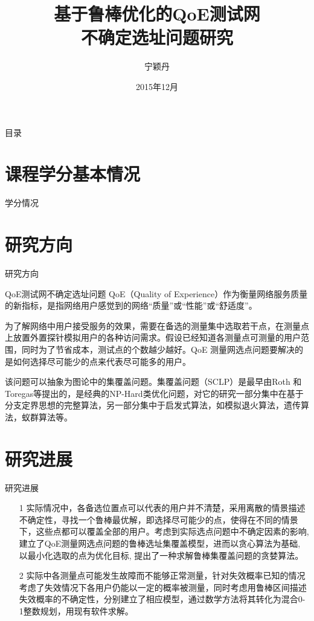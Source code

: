 \documentclass[10pt]{beamer}
\title{基于鲁棒优化的QoE测试网\\不确定选址问题研究}
\author{宁颖丹}
\institute{中国科学院大学~数学科学学院\\专业方向：运筹学与控制论\\指导教师：杨文国副教授}
\date{2015年12月}
\begin{document}
\small
\begin{frame}
  \titlepage
\end{frame}

\begin{frame}{目录}
  \tableofcontents
\end{frame}

\section{课程学分基本情况}
\begin{frame}{学分情况}

\end{frame}

\section{研究方向}
\begin{frame}{研究方向}
 \begin{block}{QoE测试网不确定选址问题}
  QoE（Quality of Experience）作为衡量网络服务质量的新指标，是指网络用户感觉到的网络“质量”或“性能”或“舒适度”。

为了解网络中用户接受服务的效果，需要在备选的测量集中选取若干点，在测量点上放置外置探针模拟用户的各种访问需求。假设已经知道各测量点可测量的用户范围，同时为了节省成本，测试点的个数越少越好。QoE 测量网选点问题要解决的是如何选择尽可能少的点来代表尽可能多的用户。
\end{block} 
该问题可以抽象为图论中的集覆盖问题。集覆盖问题（SCLP）是最早由Roth 和Toregas等提出的，是经典的NP-Hard类优化问题，对它的研究一部分集中在基于分支定界思想的完整算法，另一部分集中于启发式算法，如模拟退火算法，遗传算法，蚁群算法等。
\end{frame}
\section{研究进展}
\begin{frame}{研究进展}
  \begin{itemize}
    \item[1] 实际情况中，各备选位置点可以代表的用户并不清楚，采用离散的情景描述不确定性，寻找一个鲁棒最优解，即选择尽可能少的点，使得在不同的情景下，这些点都可以覆盖全部的用户。考虑到{\color{red}实际选点问题中不确定因素的影响, 建立了QoE测量网选点问题的鲁棒选址集覆盖模型，进而以贪心算法为基础, 以最小化选取的点为优化目标, 提出了一种求解鲁棒集覆盖问题的贪婪算法。}
    \item[2] 实际中各测量点可能发生故障而不能够正常测量，针对失效概率已知的情况考虑了失效情况下各用户仍能以一定的概率被测量，同时考虑{\color{red}用鲁棒区间描述失效概率的不确定性，分别建立了相应模型，通过数学方法将其转化为混合0-1整数规划，用现有软件求解。}

  \end{itemize}
\end{frame}
\end{document}
